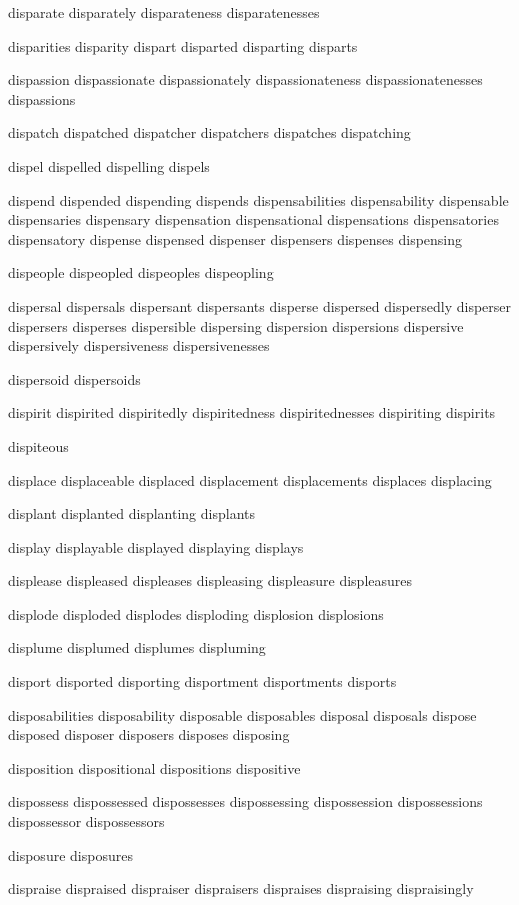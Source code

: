 \begin{itemize}
disparate disparately disparateness disparatenesses

disparities disparity dispart disparted disparting disparts

dispassion dispassionate dispassionately dispassionateness dispassionatenesses dispassions

dispatch dispatched dispatcher dispatchers dispatches dispatching

dispel dispelled dispelling dispels

dispend dispended dispending dispends dispensabilities dispensability dispensable dispensaries dispensary dispensation dispensational dispensations dispensatories dispensatory dispense dispensed dispenser dispensers dispenses dispensing

dispeople dispeopled dispeoples dispeopling

dispersal dispersals dispersant dispersants disperse dispersed dispersedly disperser dispersers disperses dispersible dispersing dispersion dispersions dispersive dispersively dispersiveness dispersivenesses

dispersoid dispersoids

dispirit dispirited dispiritedly dispiritedness dispiritednesses dispiriting dispirits

dispiteous

displace displaceable displaced displacement displacements displaces displacing

displant displanted displanting displants

display displayable displayed displaying displays

displease displeased displeases displeasing displeasure displeasures

displode disploded displodes disploding displosion displosions

displume displumed displumes displuming

disport disported disporting disportment disportments disports

disposabilities disposability disposable disposables disposal disposals dispose disposed disposer disposers disposes disposing

disposition dispositional dispositions dispositive

dispossess dispossessed dispossesses dispossessing dispossession dispossessions dispossessor dispossessors

disposure disposures

dispraise dispraised dispraiser dispraisers dispraises dispraising dispraisingly


\end{itemize}

